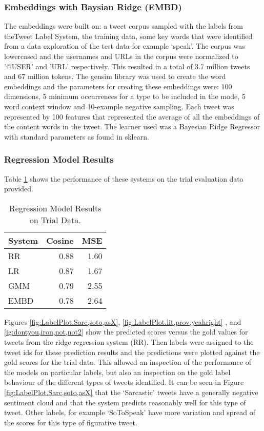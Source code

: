\documentclass[11pt,letterpaper]{article}
\begin{document}
\subsubsection{Embeddings with Baysian Ridge (EMBD)}
\label{subsec:EMBD}
The embeddings were built on: a tweet corpus sampled with the labels from theTweet Label System, the training data, some key words that were identified from a data exploration of the test data for example `speak'. The corpus was lowercased and the usernames and URLs in the corpus were normalized to '@USER' and 'URL' respectively. This resulted in a total of 3.7 million tweets and 67 million tokens.\newline
The gensim library was used to create the word embeddings and the parameters for creating these embeddings were: 100 dimensions, 5 minimum occurrences for a type to be included in the mode, 5 word context window and 10-example negative sampling.\newline
Each tweet was represented by 100 features that represented the average of all the embeddings of the content words in the tweet. The learner used was a Bayesian Ridge Regressor with standard parameters as found in sklearn.

\subsubsection{Regression Model Results}
Table \ref{tbl:regressionResults} shows the performance of these systems on the trial evaluation data provided.

\begin{table}[ht!]
\begin{center}
\begin{tabular}{|l|r|r|}
\hline
System & Cosine & MSE\\
\hline
RR & 0.88 & 1.60\\
LR & 0.87 &1.67\\
GMM & 0.79  & 2.55\\
EMBD & 0.78 & 2.64\\
\hline
\end{tabular}
\end{center}
\caption{Regression Model Results on Trial Data.}
\label{tbl:regressionResults}
\end{table}

Figures \ref{fig:LabelPlot.Sarc,soto,asX}, \ref{fig:LabelPlot.lit,prov,yeahright} , and \ref{ig:dontyou,iron,not,not2} show the predicted scores versus the gold values for tweets from the ridge regression system (RR). Then labels were assigned to the tweet ids for these prediction results and the predictions were plotted against the gold scores for the trial data. This allowed an inspection of the performance of the models on particular labels, but also an inspection on the gold label behaviour of the different types of tweets identified. It can be seen in Figure \ref{fig:LabelPlot.Sarc,soto,asX} that the `Sarcastic' tweets have a generally negative sentiment cloud and that the system predicts reasonably well for this type of tweet. Other labels, for example `SoToSpeak' have more variation and spread of the scores for this type of figurative tweet.
\end{document}
